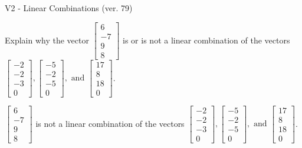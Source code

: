 \begin{exercise}
  \begin{exerciseTitle}V2 - Linear Combinations (ver. 79)\end{exerciseTitle}
  \begin{exerciseStatement}
    Explain why the vector \(\left[\begin{array}{c}
6 \\
-7 \\
9 \\
8
\end{array}\right]\)  is or is not a linear 
	combination of the vectors \(\left[\begin{array}{c}
-2 \\
-2 \\
-3 \\
0
\end{array}\right] , \left[\begin{array}{c}
-5 \\
-2 \\
-5 \\
0
\end{array}\right] , \text{ and } \left[\begin{array}{c}
17 \\
8 \\
18 \\
0
\end{array}\right]\).
	


  \end{exerciseStatement}
  \begin{exerciseAnswer}
   \(\left[\begin{array}{c}
6 \\
-7 \\
9 \\
8
\end{array}\right]\) 
  	 is not  
	a linear combination of the vectors \(\left[\begin{array}{c}
-2 \\
-2 \\
-3 \\
0
\end{array}\right] , \left[\begin{array}{c}
-5 \\
-2 \\
-5 \\
0
\end{array}\right] , \text{ and } \left[\begin{array}{c}
17 \\
8 \\
18 \\
0
\end{array}\right]\).

	
  


  \end{exerciseAnswer}
\end{exercise}